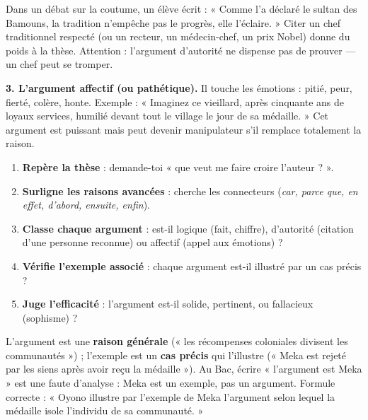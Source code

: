 \documentclass[11pt]{article}
\newcommand{\cle}[1]{{\popxbold\color{popdark}#1}}
\begin{document}
\begin{exemplebox}
Dans un débat sur la coutume, un élève écrit : « Comme l'a déclaré le sultan des Bamouns, la tradition n'empêche pas le progrès, elle l'éclaire. » Citer un chef traditionnel respecté (ou un recteur, un médecin-chef, un prix Nobel) donne du poids à la thèse. Attention : l'argument d'autorité ne dispense pas de prouver — un chef peut se tromper.
\end{exemplebox}

\textbf{3. L'argument affectif (ou pathétique).} Il touche les \cle{émotions} : pitié, peur, fierté, colère, honte. Exemple : « Imaginez ce vieillard, après cinquante ans de loyaux services, humilié devant tout le village le jour de sa médaille. » Cet argument est puissant mais peut devenir manipulateur s'il remplace totalement la raison.

\begin{methode}
\begin{enumerate}
\item \textbf{Repère la thèse} : demande-toi « que veut me faire croire l'auteur ? ».
\item \textbf{Surligne les raisons avancées} : cherche les connecteurs (\emph{car, parce que, en effet, d'abord, ensuite, enfin}).
\item \textbf{Classe chaque argument} : est-il logique (fait, chiffre), d'autorité (citation d'une personne reconnue) ou affectif (appel aux émotions) ?
\item \textbf{Vérifie l'exemple associé} : chaque argument est-il illustré par un cas précis ?
\item \textbf{Juge l'efficacité} : l'argument est-il solide, pertinent, ou fallacieux (sophisme) ?
\end{enumerate}
\end{methode}

\begin{attention}
L'\cle{argument} est une \textbf{raison générale} (« les récompenses coloniales divisent les communautés ») ; l'\cle{exemple} est un \textbf{cas précis} qui l'illustre (« Meka est rejeté par les siens après avoir reçu la médaille »). Au Bac, écrire « l'argument est Meka » est une faute d'analyse : Meka est un exemple, pas un argument. Formule correcte : « Oyono illustre par l'exemple de Meka l'argument selon lequel la médaille isole l'individu de sa communauté. »
\end{attention}
\end{document}

